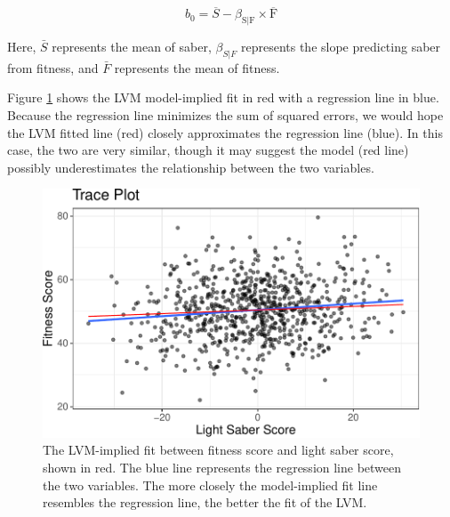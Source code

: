 \documentclass[
  english,
  man]{apa6}
\begin{document}
\[b_0=\overline{S}-\beta_{\text{S}|\text{F}}\times \overline{\text{F}}\]

\noindent Here, \(\bar{S}\) represents the mean of saber, \(\beta_{S|F}\) represents the slope predicting saber from fitness, and \(\bar{F}\) represents the mean of fitness.

Figure \ref{fig:trail1} shows the LVM model-implied fit in red with a regression line in blue. Because the regression line minimizes the sum of squared errors, we would hope the LVM fitted line (red) closely approximates the regression line (blue). In this case, the two are very similar, though it may suggest the model (red line) possibly underestimates the relationship between the two variables.

\begin{figure}

{\centering \includegraphics[width=0.7\linewidth]{flexplavaan_draft_files/figure-latex/trail1-1} 

}

\caption{The LVM-implied fit between fitness score and light saber score, shown in red. The blue line represents the regression line between the two variables. The more closely the model-implied fit line resembles the regression line, the better the fit of the LVM.}\label{fig:trail1}
\end{figure}
\end{document}
